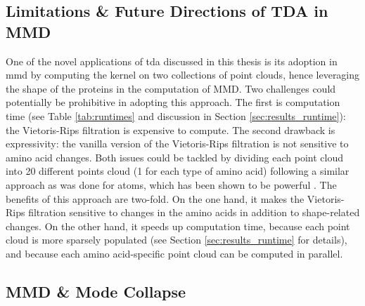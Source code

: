 

\subsection{Limitations \& Future Directions of TDA in MMD}\label{sec:tda_limitations}

One of the novel applications of \acrshort{tda} discussed in this thesis is its
adoption in \acrshort{mmd} by computing the kernel on two collections of point
clouds, hence leveraging the shape of the proteins in the computation of MMD.
Two challenges could potentially be prohibitive in adopting this approach. The
first is computation time (see Table \ref{tab:runtimes} and discussion in
Section \ref{sec:results_runtime}): the Vietoris-Rips filtration is expensive
to compute. The second drawback is expressivity: the vanilla version of the
Vietoris-Rips filtration is not sensitive to amino acid changes. Both issues
could be tackled by dividing each point cloud into 20 different points cloud (1
for each type of amino acid) following a similar approach as was done for atoms,
which has been shown to be powerful \citep{jiang2021topological}. The benefits
of this approach are two-fold. On the one hand, it makes the Vietoris-Rips
filtration sensitive to changes in the amino acids in addition to shape-related
changes. On the other hand, it speeds up computation time, because each point
cloud is more sparsely populated (see Section \ref{sec:results_runtime} for
details), and because each amino acid-specific point cloud can be computed in
parallel.


\subsection{MMD \&  Mode Collapse}\label{sec:mode_collapse_mode_drop}

